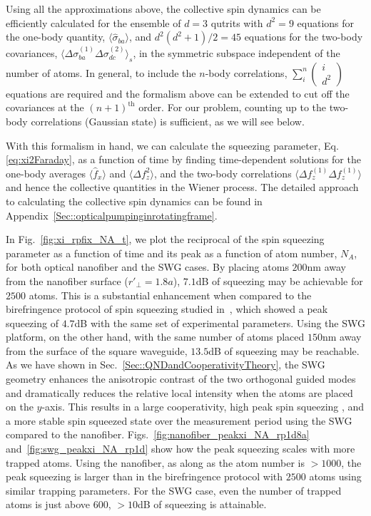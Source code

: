 \documentclass[aps,pra,twocolumn,superscriptaddress]{revtex4-1} %
\newcommand{\expect}[1]{\big\langle #1 \big\rangle}
\begin{document}
Using all the approximations above, the collective spin dynamics can be efficiently calculated for the ensemble of $d=3$  qutrits with $ d^2=9 $ equations for the one-body quantity, $ \expect{\hat{\sigma}_{ba}} $, and $ d^2(d^2+1)/2=45 $ equations for the two-body covariances, $ \expect{\Delta \sigma_{ba}^{(1)}\Delta\sigma_{dc}^{(2)} }_s $, in the symmetric subspace independent of the number of atoms.
In general, to include the $ n $-body correlations, $ \sum_i^n\left(\!\begin{array}{c}i\\d^2\end{array} \! \right) $ equations are required and the formalism above can be extended to cut off the covariances at the $ (n+1)^{\text{th}} $ order. For our problem, counting up to the two-body correlations (Gaussian state) is sufficient, as we will see below.

With this formalism in hand, we can calculate the squeezing parameter, Eq.\eqref{eq:xi2Faraday}, as a function of time by finding time-dependent solutions for the one-body averages $\expect{\hat{f}_x}$ and  $\expect{\Delta f_z^2}$, and the two-body correlations $\expect{\Delta f_z^{(1)} \Delta f_z^{(1)}}$ and hence the collective quantities in the Wiener process.  The detailed approach to calculating the collective spin dynamics can be found in Appendix~\ref{Sec::opticalpumpinginrotatingframe}.

In Fig.~\ref{fig:xi_rpfix_NA_t}, we plot the reciprocal of the spin squeezing parameter as a function of time and its peak as a function of atom number, $ N_A $, for both optical nanofiber and the SWG cases. By placing atoms $ 200 $nm away from the nanofiber surface ($ r'\!_\perp=1.8a $), $ 7.1 $dB of squeezing may be achievable for $ 2500 $ atoms. This is a substantial enhancement when compared to the birefringence protocol of spin squeezing  studied in~\cite{Qi2016}, which showed a peak squeezing  of $ 4.7 $dB with the same set of experimental parameters. Using the SWG platform, on the other hand, with the same number of atoms placed $150 $nm away from the surface of the square waveguide, $13.5$dB of squeezing may be reachable. As we have shown in Sec.~\ref{Sec::QNDandCooperativityTheory}, the SWG geometry enhances the anisotropic contrast of the two orthogonal guided modes and dramatically reduces the relative local intensity when the atoms are placed on the $ y $-axis. This results in a large cooperativity, high peak spin squeezing , and a more stable spin squeezed state over the measurement period using the SWG compared to the nanofiber. Figs.~\ref{fig:nanofiber_peakxi_NA_rp1d8a} and~\ref{fig:swg_peakxi_NA_rp1d} show how the peak squeezing scales with more trapped atoms. Using the nanofiber, as along as the atom number is  $>1000 $, the peak  squeezing  is larger than in the birefringence protocol with $ 2500 $ atoms using similar trapping parameters. For the SWG case, even the number of trapped atoms is just above $ 600 $, $ >10 $dB of  squeezing is attainable.
\end{document}
